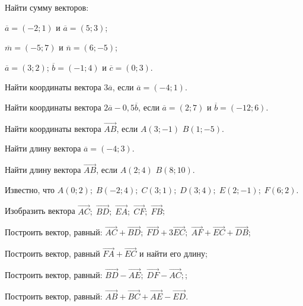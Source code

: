 \begin{consultation}
	\begin{listofex}
		\item Найти сумму векторов:
		\begin{enumcols}[itemcolumns=2]
			\item \( \overline{a}=(-2;1) \) и \( \overline{a}=(5;3) \);
			\item \( \overline{m}=(-5;7) \) и \( \overline{n}=(6;-5) \);
			\item \( \overline{a}=(3;2) \); \( \overline{b}=(-1;4) \) и \( \overline{c}=(0;3) \).
		\end{enumcols}
		\item Найти координаты вектора \( 3\overline{a} \), если \( \overline{a}=(-4;1) \).
		\item Найти координаты вектора \( 2\overline{a}-0,5\overline{b} \), если \( \overline{a}=(2;7) \) и \( \overline{b}=(-12;6) \).
		\item Найти координаты вектора \( \overrightarrow{AB} \), если \( A(3;-1) \) \( B(1;-5) \).
		\item Найти длину вектора \( \overline{a}=(-4;3) \).
		\item Найти длину вектора \( \overrightarrow{AB} \), если \( A(2;4) \) \( B(8;10) \).
		\item Известно, что \( A(0;2);\;B(-2;4);\;C(3;1);\;D(3;4);\;E(2;-1);\;F(6;2) \).
		\begin{enumcols}
			\item Изобразить вектора \( \overrightarrow{AC};\;\overrightarrow{BD};\; \overrightarrow{EA};\;\overrightarrow{CF};\;\overrightarrow{FB} \);
			\item Построить вектор, равный: \( \overrightarrow{AC}+\overrightarrow{BD};\;\overrightarrow{FD}+3\overrightarrow{EC};\;\overrightarrow{AF}+\overrightarrow{EC}+\overrightarrow{DB} \);
			\item Построить вектор, равный \( \overrightarrow{FA}+\overrightarrow{EC} \) и найти его длину;
			\item Построить вектор, равный: \( \overrightarrow{BD}-\overrightarrow{AE};\;\overrightarrow{DF}-\overrightarrow{AC}; \);
			\item Построить вектор, равный: \( \overrightarrow{AB}+\overrightarrow{BC}+\overrightarrow{AE}-\overrightarrow{ED} \).
		\end{enumcols}
	\end{listofex}
\end{consultation}